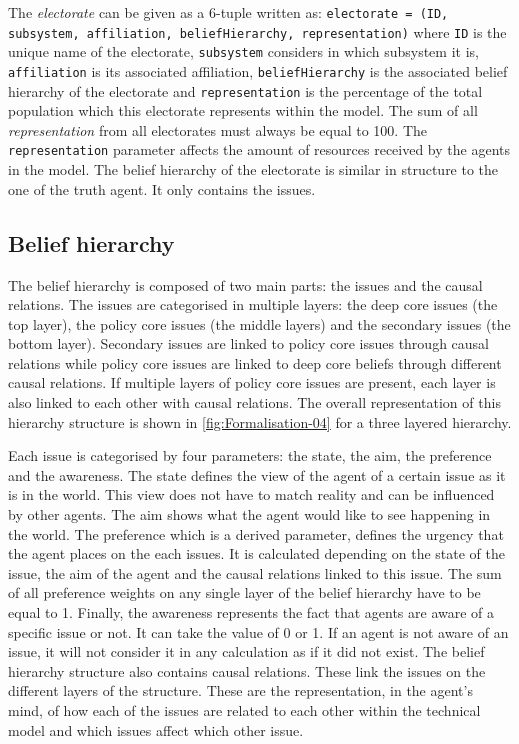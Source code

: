 The \emph{electorate} can be given as a 6-tuple written as: \texttt{electorate = (ID, subsystem, affiliation, beliefHierarchy, representation)} where \texttt{ID} is the unique name of the electorate, \texttt{subsystem} considers in which subsystem it is, \texttt{affiliation} is its associated affiliation, \texttt{beliefHierarchy} is the associated belief hierarchy of the electorate and \texttt{representation} is the percentage of the total population which this electorate represents within the model. The sum of all \emph{representation} from all electorates must always be equal to 100. The \texttt{representation} parameter affects the amount of resources received by the agents in the model. The belief hierarchy of the electorate is similar in structure to the one of the truth agent. It only contains the issues.

\subsection{Belief hierarchy}

The belief hierarchy is composed of two main parts: the issues and the causal relations. The issues are categorised in multiple layers: the deep core issues (the top layer), the policy core issues (the middle layers) and the secondary issues (the bottom layer). Secondary issues are linked to policy core issues through causal relations while policy core issues are linked to deep core beliefs through different causal relations. If multiple layers of policy core issues are present, each layer is also linked to each other with causal relations. The overall representation of this hierarchy structure is shown in \autoref{fig:Formalisation-04} for a three layered hierarchy.

Each issue is categorised by four parameters: the state, the aim, the preference and the awareness. The state defines the view of the agent of a certain issue as it is in the world. This view does not have to match reality and can be influenced by other agents. The aim shows what the agent would like to see happening in the world. The preference  which is a derived parameter, defines the urgency that the agent places on the each issues. It is calculated depending on the state of the issue, the aim of the agent and the causal relations linked to this issue. The sum of all preference weights on any single layer of the belief hierarchy have to be equal to 1. Finally, the awareness represents the fact that agents are aware of a specific issue or not. It can take the value of 0 or 1. If an agent is not aware of an issue, it will not consider it in any calculation as if it did not exist. The belief hierarchy structure also contains causal relations. These link the issues on the different layers of the structure. These are the representation, in the agent's mind, of how each of the issues are related to each other within the technical model and which issues affect which other issue.


